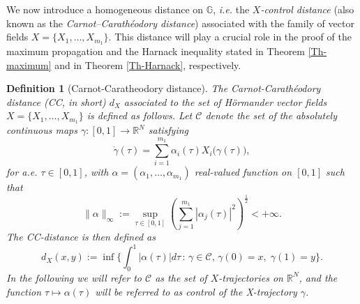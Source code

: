 \documentclass[11pt,a4paper]{article}
\newtheorem{definition}[theorem]{\bf Definition}
\numberwithin{equation}{section}
\newcommand{\R}{\mathbb{R}}
\def \GG {{\mathbb{G}}}
\def \a {{\alpha}}
\def \t {{\tau}}
\begin{document}
\medskip

We now introduce a homogeneous distance on $\GG$, \emph{i.e.} the \textit{$X$-control distance} (also known as the \textit{Carnot–Carathéodory distance}) associated with the family of vector fields $X = \{ X_1, \ldots, X_{m_1} \}$. This distance will play a crucial role in the proof of the maximum propagation and the Harnack inequality stated in Theorem \ref{Th-maximum} and in Theorem \ref{Th-Harnack}, respectively.
\begin{definition}[Carnot-Caratheodory distance]\label{CC-distance}
	The Carnot-Carathéodory distance (CC, in short) $d_X$ associated to the set of H\"{o}rmander vector fields $X = \lbrace X_1, \ldots, X_{m_1} \rbrace$ is defined as follows. Let $\mathcal{C}$ denote the set of the absolutely continuous maps $\gamma:[0,1] \rightarrow \R^N$ satisfying 
	\begin{equation*}
		\dot{\gamma}(\t)=\sum_{i=1}^{m_1}\alpha_i(\t)X_i\big(\gamma(\t)\big),
	\end{equation*}
	for a.e. $\t\in[0,1]$, with $\alpha=(\alpha_1,\ldots,\alpha_{m_1})$ real-valued function on $[0,1]$ such that
	\begin{equation}\label{condition-alphaj}
		 \|\a\|_{\infty}:= \sup_{\t\in[0,1]}\left(\sum_{j=1}^{m_1}|\alpha_j(\t)|^2\right)^{\frac{1}{2}}<+\infty.
	\end{equation}	%
	The CC-distance is then defined as 
	\begin{equation*}\label{d_X}
		d_X(x,y):=\inf\Bigg\lbrace \int_0^1 |\a(\t)|d\t \, : \, \gamma \in \mathcal{C},\,\gamma(0)=x,\; \gamma(1)=y\Bigg\rbrace.
	\end{equation*}
	In the following we will refer to $\mathcal{C}$ as the set of \emph{$X$-trajectories on $\R^N$}, and the function $\t\mapsto\a(\t)$ will be referred to as \emph{control} of the X-trajectory $\gamma$. 
\end{definition}
\end{document}
